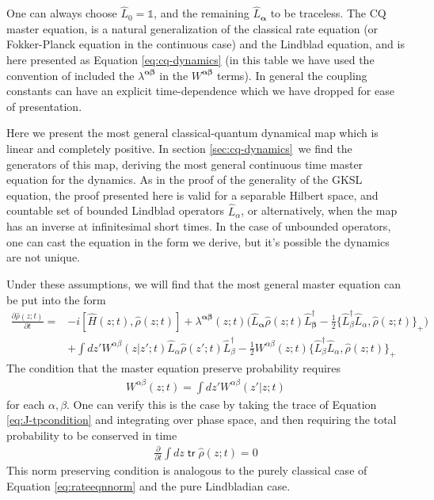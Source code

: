 \documentclass[aps,pra,showpacs,citeautoscript,amsmath,amssymb,floatfix,superscriptaddress,bbm, verbatim,amsfonts,changes,10pt,nofootinbib,longbibliography]{revtex4-1}
\newcommand{\id}{\mathbb{1}}
\newcommand{\tr}{\mathop{\mathsf{tr}}\nolimits}
\newcommand{\ag}{{\boldsymbol\alpha}}
\newcommand{\bg}{{\boldsymbol\beta}}
\def\z{{z}}
\def\L{{\hat{L}}}
\def\Hq{\hat{H}}
\def\dz{{d\z}}
\def\rate{{W}}
\def\linrate{{\lambda}}
\renewcommand{\varrho}{\hat{\rho}}
\def\psiz{{\varrho(\z;t)}}
\def\psizt{{\varrho(\z;t)}}
\def\psizp{{\varrho(\z';t)}}
\begin{document}
\begin{table}
\begin{center}
{				One can always choose $\L_0=\id$, and the remaining $\L_\ag$ to be traceless\cite{UCLPawula}.
				The CQ master equation, is a natural generalization of the classical rate equation (or Fokker-Planck equation in the continuous case) and the Lindblad equation, and is here presented as Equation \eqref{eq:cq-dynamics} (in this table we have used the convention of included the $\lambda^{\ag\bg}$ in the $\rate^{\ag\bg}$ terms). In general the coupling constants can have an explicit time-dependence which we have dropped for ease of presentation.}
		\endgroup
	\end{center}
\end{table}

Here we present the most general classical-quantum dynamical map which is linear and completely positive. In section \ref{sec:cq-dynamics}\ we find the generators of this map, deriving the most general continuous time master equation for the dynamics. As in the proof of the generality of the GKSL equation, the proof presented here is valid for a separable Hilbert space, and countable set of bounded Lindblad operators $\L_\alpha$, or alternatively, when the map has an inverse at infinitesimal short times.
In the case of unbounded operators\cite{siemon2017unbounded}, one can cast the equation in the form we derive, but it's possible the dynamics are not unique. %

Under these assumptions, we will find that the most general master equation can be put into the form
\begin{align}
  \frac{\partial\psiz}{\partial t}
  =&-i[\Hq(\z;t),\psiz]+
 \linrate^{\ag\bg}(\z;t)\Big(
\L_{\ag}\psizt \L_{\bg}^\dagger
  -
  \frac{1}{2}\{\L_\beta^\dagger\L_\alpha,\psiz\}_+
  \Big)
  \nonumber\\
&+
 \int d\z' 
 \rate^{\alpha\beta}(\z|\z';t)
  \L_{\alpha}\psizp\L_{\beta}^\dagger  
-\frac{1}{2}\rate^{\alpha\beta}(\z;t)\{\L_\beta^\dagger\L_\alpha,\psiz\}_+
      \label{eq:cq-dynamics}
\end{align}
The condition that the master equation preserve probability requires
\begin{align}
\rate^{\alpha\beta}(\z;t)=\int \dz' \rate^{\alpha\beta}(\z'|\z;t)
\label{eq:J-tpcondition}
\end{align}
for each $\alpha,\beta$.
One can verify this is the case by  taking the trace of Equation \eqref{eq:J-tpcondition} and integrating over phase space, and then requiring the total probability to be conserved in time
\begin{align}
\frac{\partial}{\partial t}\int d\z\tr\psiz=0
\label{eq:tp-intime}
\end{align}
This norm preserving condition is analogous to the purely classical case of Equation \eqref{eq:rateeqnnorm} and the pure Lindbladian case.
\end{document}
